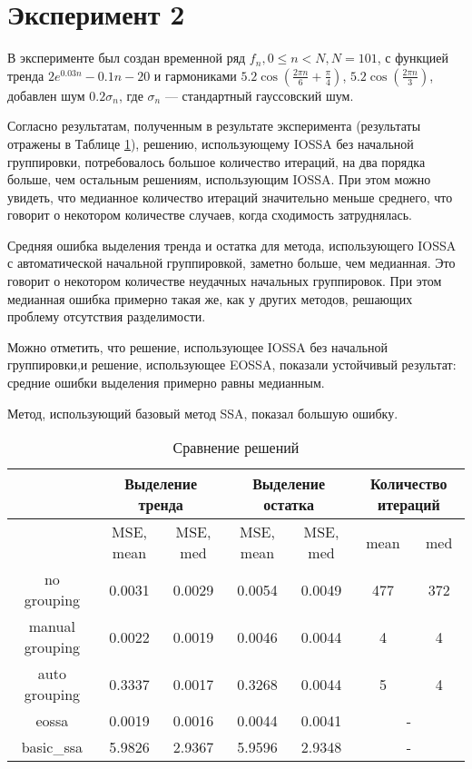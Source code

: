 \documentclass[specialist, substylefile = spbureport.rtx, subf,href,colorlinks=true, 12pt]{disser}
\theoremstyle{definition}
\begin{document}
\section{Эксперимент 2}
\label{exp2}
В эксперименте был создан временной ряд $f_n , 0\leq n < N, N=101$, с функцией тренда $2e^{0.03n} - 0.1n - 20$ и гармониками $5.2\cos (\frac{2\pi n}{6} + \frac{\pi}{4})$, $5.2\cos (\frac{2 \pi n} {3})$,  добавлен шум $0.2 \sigma_n$, где $\sigma_n$ --- стандартный гауссовский шум.

Согласно результатам, полученным в результате эксперимента (результаты отражены в Таблице \ref{tabular:2}), решению, использующему IOSSA без начальной группировки, потребовалось большое количество итераций, на два порядка больше, чем остальным решениям, использующим IOSSA. При этом можно увидеть, что медианное количество итераций значительно меньше среднего, что говорит о некотором количестве случаев, когда сходимость затруднялась.

Средняя ошибка выделения тренда и остатка для метода, использующего IOSSA с автоматической начальной группировкой, заметно больше, чем медианная. Это говорит о некотором количестве неудачных начальных группировок. При этом медианная ошибка примерно такая же, как у других методов, решающих проблему отсутствия разделимости.

Можно отметить, что решение, использующее IOSSA без начальной группировки,и решение, использующее EOSSA, показали устойчивый результат: средние ошибки выделения примерно равны медианным.

Метод, использующий базовый метод SSA, показал большую ошибку.

\begin{table}[H]
\footnotesize
\caption{Сравнение решений}
\label{tabular:2}
\begin{center}
\begin{tabular}{|c | c| c| c| c| c| c|}
\hline
 \multirow{2}{}{}& \multicolumn{2}{c|}{Выделение тренда} & \multicolumn{2}{c|}{Выделение остатка} & \multicolumn{2}{c|}{Количество итераций} \\
 \hline
 & MSE, mean & MSE, med & MSE, mean & MSE, med & mean & med  \\
\hline
no grouping &  0.0031 & 0.0029 & 0.0054 & 0.0049 & 477 & 372 \\
manual grouping & 0.0022 & 0.0019 & 0.0046 & 0.0044 & 4 & 4 \\
auto grouping &  0.3337 & 0.0017 & 0.3268 & 0.0044 & 5 & 4 \\
\hline
eossa &  0.0019 & 0.0016 & 0.0044 & 0.0041 & \multicolumn{2}{c|}{-} \\
basic\_ssa &  5.9826 & 2.9367 & 5.9596 & 2.9348 & \multicolumn{2}{c|}{-} \\
\hline
\end{tabular}
\end{center}
\end{table}
\end{document}
